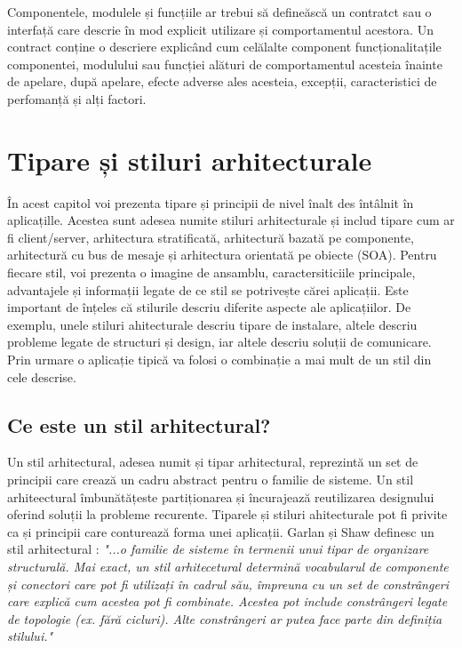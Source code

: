 \documentclass[12pt, a4paper, oneside, romanian]{teza-upb}
\begin{document}
Componentele, modulele și funcțiile ar trebui să defineăscă un contratct  sau o interfață care descrie în mod explicit utilizare și comportamentul acestora. Un contract conține o descriere explicând cum celălalte component funcționalitațile componentei, modulului sau funcției alături de comportamentul acesteia înainte de apelare, după apelare, efecte adverse ales acesteia, excepții, caracteristici de perfomanță și alți factori.


\chapter{Tipare și stiluri arhitecturale}

În acest capitol voi prezenta tipare și principii de nivel înalt des întâlnit în aplicațille. Acestea sunt adesea numite stiluri arhitecturale și includ tipare cum ar fi client/server, arhitectura stratificată, arhitectură bazată pe componente, arhitectură cu bus de mesaje și arhitectura orientată pe obiecte (SOA). Pentru fiecare stil, voi prezenta o imagine de ansamblu, caractersiticiile principale, advantajele și informații legate de ce stil se potrivește cărei aplicații. Este important de înțeles că stilurile descriu diferite aspecte ale aplicațiilor. De exemplu, unele stiluri ahitecturale descriu tipare de instalare, altele descriu probleme legate de structuri și design, iar altele descriu soluții de comunicare. Prin urmare o aplicație tipică va folosi o combinație a mai mult de un stil din cele descrise.

\section{Ce este un stil arhitectural?}

Un stil arhitectural, adesea numit și tipar arhitectural, reprezintă un set de principii care crează un cadru abstract pentru o familie de sisteme. Un stil arhiteectural îmbunătățeste partiționarea și încurajează reutilizarea designului oferind soluții la probleme recurente. Tiparele și stiluri ahitecturale pot fi privite ca și principii care conturează forma unei aplicații. Garlan și Shaw definesc un stil arhitectural : \emph{"...o familie de sisteme în termenii unui tipar de organizare structurală. Mai exact, un stil arhitecetural determină vocabularul de componente și conectori care pot fi utilizați în cadrul său, împreuna cu un set de constrângeri care explică cum acestea pot fi combinate. Acestea pot include constrângeri legate de topologie (ex. fără cicluri). Alte constrângeri ar putea face parte din definiția stilului."}
\end{document}
